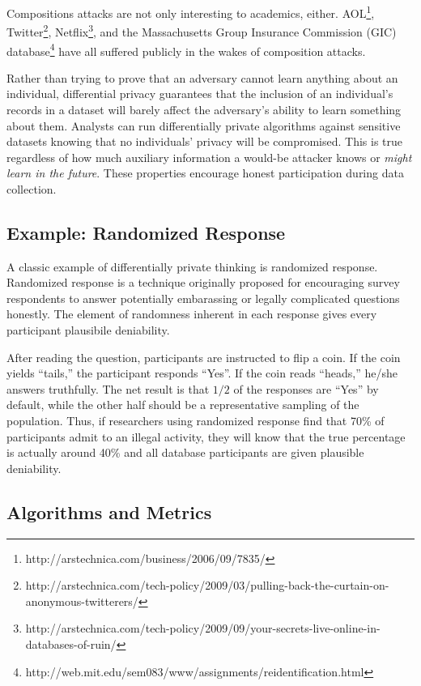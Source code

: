 \documentclass[12pt]{report}
\begin{document}
Compositions attacks are not only interesting to academics, either.
AOL\footnote{\label{fn:aol} http://arstechnica.com/business/2006/09/7835/}, Twitter\footnote{\label{fn:twitter}http://arstechnica.com/tech-policy/2009/03/pulling-back-the-curtain-on-anonymous-twitterers/}, Netflix\footnote{\label{fn:netflix}http://arstechnica.com/tech-policy/2009/09/your-secrets-live-online-in-databases-of-ruin/}, and the Massachusetts Group Insurance Commission (GIC) database\footnote{\label{fn:gic}http://web.mit.edu/sem083/www/assignments/reidentification.html} have all suffered publicly in the wakes of composition attacks.

Rather than trying to prove that an adversary cannot learn anything about an individual, differential privacy guarantees that the inclusion of an individual's records in a dataset will barely affect the adversary's ability to learn something about them.
Analysts can run differentially private algorithms against sensitive datasets knowing that no individuals' privacy will be compromised.
This is true regardless of how much auxiliary information a would-be attacker knows or \textit{might learn in the future}\cite{journals/cacm/Dwork11}.
These properties encourage honest participation during data collection.

\subsection{Example: Randomized Response}

A classic example of differentially private thinking is randomized response.
Randomized response is a technique originally proposed for encouraging survey respondents to answer potentially embarassing or legally complicated questions honestly\cite{warner1965randomized}.
The element of randomness inherent in each response gives every participant plausibile deniability.

After reading the question, participants are instructed to flip a coin.
If the coin yields ``tails,'' the participant responds ``Yes''.
If the coin reads ``heads,'' he/she answers truthfully.
The net result is that $1/2$ of the responses are ``Yes'' by default, while the other half should be a representative sampling of the population.
Thus, if researchers using randomized response find that 70\% of participants admit to an illegal activity, they will know that the true percentage is actually around 40\% and all database participants are given plausible deniability.

\subsection{Algorithms and Metrics}
\end{document}
